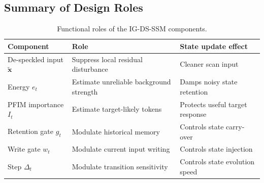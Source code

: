 \documentclass[10pt]{article}
\begin{document}
\subsection{Summary of Design Roles}

\begin{table}[h]
\centering
\small
\begin{tabular}{lll}
\toprule
Component & Role & State update effect \\
\midrule
De-speckled input $\widetilde{\mathbf{x}}$ & Suppress local residual disturbance & Cleaner scan input \\
Energy $e_t$ & Estimate unreliable background strength & Damps noisy state retention \\
PFIM importance $I_t$ & Estimate target-likely tokens & Protects useful target response \\
Retention gate $g_t$ & Modulate historical memory & Controls state carry-over \\
Write gate $w_t$ & Modulate current input writing & Controls state injection \\
Step $\Delta_t$ & Modulate transition sensitivity & Controls state evolution speed \\
\bottomrule
\end{tabular}
\caption{Functional roles of the IG-DS-SSM components.}
\label{tab:roles}
\end{table}
\end{document}
